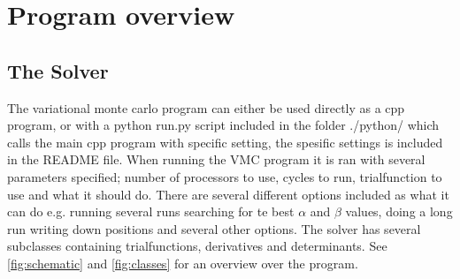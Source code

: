 \appendix

\section{Program overview}
	\subsection{The Solver}
	The variational monte carlo program can either be used directly as a cpp program, or with a python run.py script included in the folder ./python/ which calls the main cpp program with specific setting, the spesific settings is included in the README file. When running the VMC program it is ran with several parameters specified; number of processors to use, cycles to run, trialfunction to use and what it should do. There are several different options included as what it can do e.g. running several runs searching for te best \(\alpha \) and $\beta$ values, doing a long run writing down positions and several other options. The solver has several subclasses containing trialfunctions, derivatives and determinants. See \cref{fig:schematic} and \cref{fig:classes} for an overview over the program.

